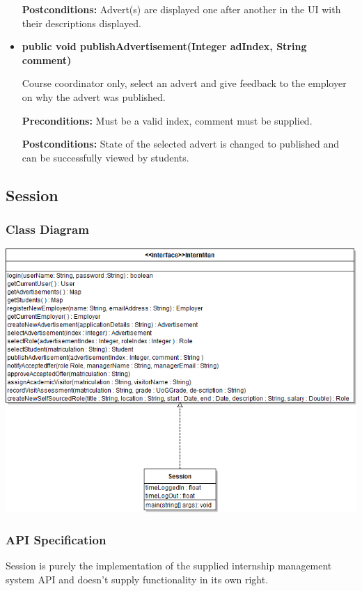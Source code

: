 \documentclass[11pt]{l3deliverable}
\begin{document}
\begin{itemize}
{\textbf{Postconditions:} Advert(s) are displayed one after another in the UI with their
descriptions displayed.}

\item{\textbf{public void publishAdvertisement(Integer adIndex, String comment)}

Course coordinator only, select an advert and give feedback to the employer on why the advert was published.

\textbf{Preconditions:} Must be a valid index, comment must be supplied.

\textbf{Postconditions:} State of the selected advert is changed to published and can be
successfully viewed by students.}

\end{itemize}
\newpage

\subsection{Session}

\subsubsection{Class Diagram}

\includegraphics[scale=0.65,angle=90]{SessionClassDiagram.png}

\subsubsection{API Specification}

Session is purely the implementation of the supplied internship management
system API and doesn't supply functionality in its own right.
\end{document}
